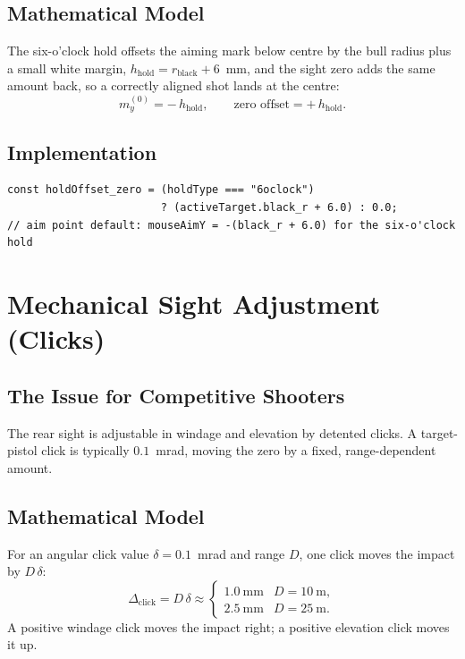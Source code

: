 \documentclass[11pt]{article}
\begin{document}
\subsection{Mathematical Model}

The six-o'clock hold offsets the aiming mark below centre by the bull
radius plus a small white margin, $h_{\text{hold}} = r_{\text{black}} + 6$~mm,
and the sight zero adds the same amount back, so a correctly aligned shot
lands at the centre:
\begin{equation}
  m_y^{(0)} = -\,h_{\text{hold}}, \qquad
  \text{zero offset} = +\,h_{\text{hold}} .
\end{equation}

\subsection{Implementation}

\begin{lstlisting}
const holdOffset_zero = (holdType === "6oclock")
                        ? (activeTarget.black_r + 6.0) : 0.0;
// aim point default: mouseAimY = -(black_r + 6.0) for the six-o'clock hold
\end{lstlisting}

\section{Mechanical Sight Adjustment (Clicks)}\label{sec:clicks}

\subsection{The Issue for Competitive Shooters}

The rear sight is adjustable in windage and elevation by detented clicks.
A target-pistol click is typically $0.1$~mrad, moving the zero by a fixed,
range-dependent amount.

\subsection{Mathematical Model}

For an angular click value $\delta = 0.1$~mrad and range $D$, one click
moves the impact by $D\,\delta$:
\begin{equation}
  \Delta_{\text{click}} = D\,\delta \approx
  \begin{cases}
    1.0~\text{mm} & D = 10~\text{m},\\
    2.5~\text{mm} & D = 25~\text{m}.
  \end{cases}
\end{equation}
A positive windage click moves the impact right; a positive elevation
click moves it up.
\end{document}
